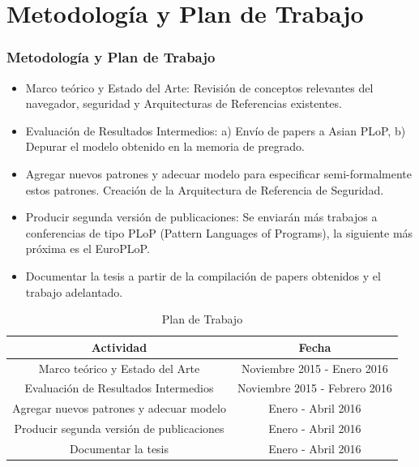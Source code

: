 \documentclass[serif,9pt]{beamer}
\begin{document}
\section{Metodología y Plan de Trabajo}
\begin{frame}
	\frametitle{Metodología y Plan de Trabajo}
	\begin{itemize}
		\item Marco teórico y Estado del Arte: Revisión de conceptos relevantes del navegador, seguridad y Arquitecturas de Referencias existentes.
		\item Evaluación de Resultados Intermedios: a) Envío de papers a Asian PLoP, b) Depurar el modelo obtenido en la memoria de pregrado.
		\item Agregar nuevos patrones y adecuar modelo para especificar semi-formalmente estos patrones. Creación de la Arquitectura de Referencia de Seguridad.
		\item Producir segunda versión de publicaciones: Se enviarán más trabajos a conferencias de tipo PLoP (Pattern Languages of Programs), la siguiente más próxima es el EuroPLoP.
		\item Documentar la tesis a partir de la compilación de papers obtenidos y el trabajo adelantado.
	\end{itemize}

	\begin{table}
        \begin{tabular}{|c|c|} 
        \hline        
        \textbf{Actividad} & \textbf{Fecha}\\
        \hline
        Marco teórico y Estado del Arte & Noviembre 2015 - Enero 2016\\
        \hline
        Evaluación de Resultados Intermedios & Noviembre 2015  - Febrero 2016\\
        \hline
        Agregar nuevos patrones y adecuar modelo & Enero - Abril 2016\\
        \hline
        Producir segunda versión de publicaciones & Enero - Abril 2016\\
        \hline
        Documentar la tesis & Enero - Abril 2016\\        
        \hline
        \end{tabular}
        \caption{Plan de Trabajo}
        \label{tab:trabajo}
    \end{table}
\end{frame}
\end{document}
